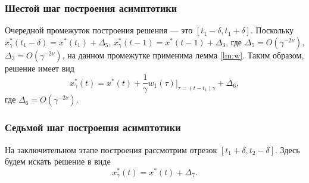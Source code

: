 \subsubsection{Шестой шаг построения асимптотики}

Очередной промежуток построения решения --- это $[t_1-\delta, t_1+\delta]$. Поскольку $x^*_{\gamma}(t_1 - \delta) = x^*(t_1) + \Delta_5$, $x^*_{\gamma}(t - 1) = x^*(t - 1) + \Delta_3$, где $\Delta_5 = O(\gamma^{-2\nu})$, $\Delta_3 = O(\gamma^{-2\nu})$, на данном промежутке применима лемма \ref{lm:w}. Таким образом, решение имеет вид
\begin{equation}
	\label{eq:sol_6}
	x_{\gamma}^*(t) = x^*(t) + \frac{1}{\gamma} w_1(\tau)\bigg\vert_{\tau=(t - t_1)\gamma} + \Delta_6,
\end{equation}
где $\Delta_6 = O(\gamma^{-2\nu})$.


\subsubsection{Седьмой шаг построения асимптотики}

На заключительном этапе построения рассмотрим отрезок $[t_1+\delta, t_2-\delta]$. Здесь будем искать решение в виде
\begin{equation}
	\label{eq:sol_7}
	x_\gamma^*(t) = x^*(t) + \Delta_7.
\end{equation}

